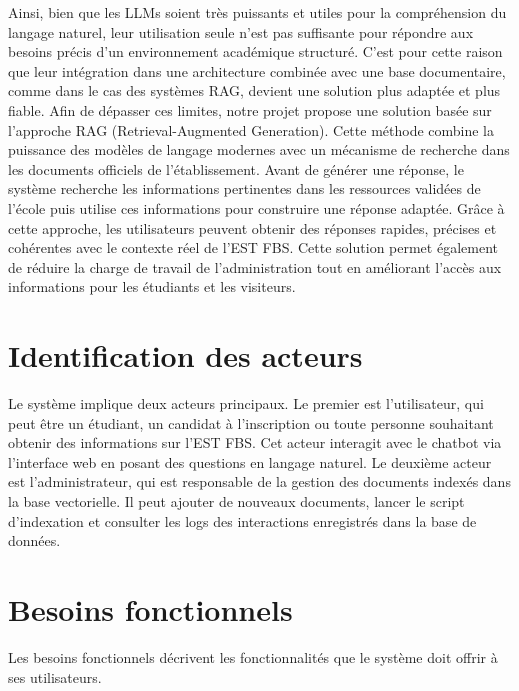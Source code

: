 \documentclass[12pt, a4paper, twoside]{report}
\begin{document}
Ainsi, bien que les LLMs soient très puissants et utiles pour la compréhension du \newline  langage naturel, leur utilisation seule n’est pas suffisante pour répondre aux besoins précis d’un environnement académique structuré. C’est pour cette raison que leur intégration dans une architecture combinée avec une base documentaire, comme dans le cas des \newline systèmes RAG, devient une solution plus adaptée et plus fiable.
\newpage
Afin de dépasser ces limites, notre projet propose une solution basée sur l’approche RAG (Retrieval-Augmented Generation). Cette méthode combine la puissance des \newline modèles de langage modernes avec un mécanisme de recherche dans les documents \newline officiels de l’établissement. Avant de générer une réponse, le système recherche les \newline informations pertinentes dans les ressources validées de l’école puis utilise ces \newline informations pour construire une réponse adaptée. Grâce à cette approche, les utilisateurs peuvent obtenir des réponses rapides, précises et cohérentes avec le contexte réel de l’EST FBS. Cette solution permet également de réduire la charge de travail de \newline l’administration tout en améliorant l’accès aux informations pour \newline les étudiants et les visiteurs.
\newline

\section{Identification des acteurs}
Le système implique deux acteurs principaux. Le premier est l'utilisateur, qui peut être un étudiant, un candidat à l'inscription ou toute personne souhaitant obtenir des informations sur l'EST FBS. Cet acteur interagit avec le chatbot via l'interface web en posant des questions en langage naturel. Le deuxième acteur est l'administrateur, qui est responsable de la gestion des documents indexés dans la base vectorielle. Il peut ajouter de nouveaux documents, lancer le script d'indexation et consulter les logs des interactions enregistrés dans la base de données. \newpage
\section{Besoins fonctionnels}
Les besoins fonctionnels décrivent les fonctionnalités que le système doit offrir à ses utilisateurs.
\end{document}
